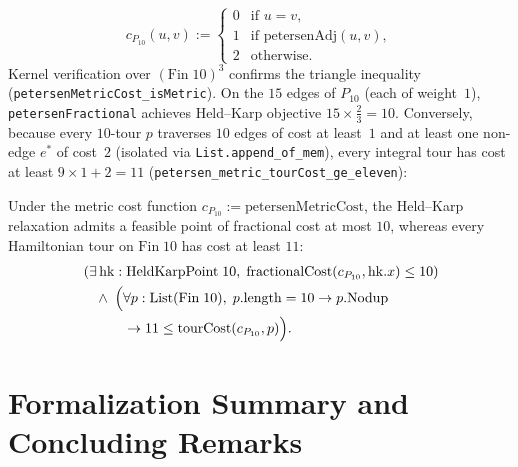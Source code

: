 \begin{itemize}
  \begin{equation}
    c_{P_{10}}(u, v) := \begin{cases} 0 & \text{if } u = v, \\ 1 & \text{if } \mathrm{petersenAdj}(u, v), \\ 2 & \text{otherwise.} \end{cases}
  \end{equation}
  Kernel verification over $(\mathrm{Fin}\;10)^3$ confirms the triangle inequality (\texttt{petersenMetricCost\_isMetric}). On the $15$ edges of $P_{10}$ (each of weight~$1$), \texttt{petersenFractional} achieves Held--Karp objective $15 \times \frac{2}{3} = 10$. Conversely, because every $10$-tour $p$ traverses $10$ edges of cost at least~$1$ and at least one non-edge $e^*$ of cost~$2$ (isolated via \texttt{List.append\_of\_mem}), every integral tour has cost at least $9 \times 1 + 2 = 11$ (\texttt{petersen\_metric\_tourCost\_ge\_eleven}):
\end{itemize}
\begin{theorem}
Under the metric cost function $c_{P_{10}} := \mathrm{petersenMetricCost}$, the Held--Karp relaxation admits a feasible point of fractional cost at most $10$, whereas every Hamiltonian tour on $\mathrm{Fin}\;10$ has cost at least $11$:
\[
\begin{aligned}
  &\left(\exists\,\mathrm{hk} : \mathrm{HeldKarpPoint}\;10,\; \mathrm{fractionalCost}(c_{P_{10}}, \mathrm{hk}.x) \le 10\right) \\
  &\quad\land\;\Bigl(\forall p : \mathrm{List}(\mathrm{Fin}\;10),\; p.\mathrm{length} = 10 \to p.\mathrm{Nodup} \\
  &\qquad\quad\to 11 \le \mathrm{tourCost}(c_{P_{10}}, p)\Bigr).
\end{aligned}
\]
\end{theorem}

\section{Formalization Summary and Concluding Remarks}
\label{sec:summary}


